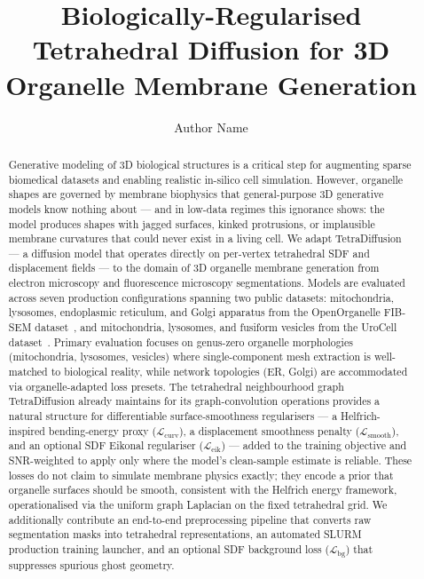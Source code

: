 \documentclass[10pt, a4paper, twocolumn]{article}
\begin{document}
\title{Biologically-Regularised Tetrahedral Diffusion for 3D Organelle Membrane Generation}
\author{Author Name}
\date{}

\maketitle

\begin{abstract}
Generative modeling of 3D biological structures is a critical step for augmenting sparse biomedical datasets and enabling realistic in-silico cell simulation. However, organelle shapes are governed by membrane biophysics that general-purpose 3D generative models know nothing about — and in low-data regimes this ignorance shows: the model produces shapes with jagged surfaces, kinked protrusions, or implausible membrane curvatures that could never exist in a living cell. We adapt TetraDiffusion~\cite{kalischek2022tetradiffusion} — a diffusion model that operates directly on per-vertex tetrahedral SDF and displacement fields — to the domain of 3D organelle membrane generation from electron microscopy and fluorescence microscopy segmentations. Models are evaluated across seven production configurations spanning two public datasets: mitochondria, lysosomes, endoplasmic reticulum, and Golgi apparatus from the OpenOrganelle FIB-SEM dataset~\cite{heinrich2021whole}, and mitochondria, lysosomes, and fusiform vesicles from the UroCell dataset~\cite{matuszewski2020urocell}. Primary evaluation focuses on genus-zero organelle morphologies (mitochondria, lysosomes, vesicles) where single-component mesh extraction is well-matched to biological reality, while network topologies (ER, Golgi) are accommodated via organelle-adapted loss presets. The tetrahedral neighbourhood graph TetraDiffusion already maintains for its graph-convolution operations provides a natural structure for differentiable surface-smoothness regularisers — a Helfrich-inspired bending-energy proxy ($\mathcal{L}_{\text{curv}}$), a displacement smoothness penalty ($\mathcal{L}_{\text{smooth}}$), and an optional SDF Eikonal regulariser ($\mathcal{L}_{\text{eik}}$) — added to the training objective and SNR-weighted to apply only where the model's clean-sample estimate is reliable. These losses do not claim to simulate membrane physics exactly; they encode a prior that organelle surfaces should be smooth, consistent with the Helfrich energy framework, operationalised via the uniform graph Laplacian on the fixed tetrahedral grid. We additionally contribute an end-to-end preprocessing pipeline that converts raw segmentation masks into tetrahedral representations, an automated SLURM production training launcher, and an optional SDF background loss ($\mathcal{L}_{\text{bg}}$) that suppresses spurious ghost geometry.
\end{abstract}
\end{document}
